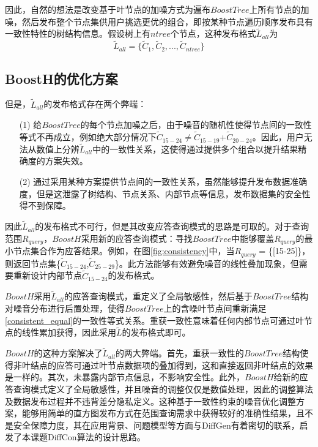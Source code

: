 因此，自然的想法是改变基于叶节点的加噪方式为遍布$BoostTree$上所有节点的加噪，然后发布整个节点集供用户挑选更优的组合，即按某种节点遍历顺序发布具有一致性特性的树结构信息。假设树上有$ntree$个节点，这种发布格式$\tilde{L}_{all}$为
\begin{equation}
\label{L_allnodes}
\tilde{L}_{all} = \{\tilde{C}_{1},\tilde{C}_{2},...,\tilde{C}_{ntree}\}
\end{equation}

\subsection{BoostH的优化方案}
\label{BoostH}

但是，$\tilde{L}_{all}$的发布格式存在两个弊端：
\begin{itemize}
	\item[(1)] 给$BoostTree$的每个节点加噪之后，由于噪音的随机性使得节点间的一致性等式不再成立，例如绝大部分情况下{$\tilde{C}_{15-24}$}$ \neq ${$\tilde{C}_{15-19}$}+{$\tilde{C}_{20-24}$}。因此，用户无法从数值上分辨$\tilde{L}_{all}$中的一致性关系，这使得通过提供多个组合以提升结果精确度的方案失效。
	\item[(2)] 通过采用某种方案提供节点间的一致性关系，虽然能够提升发布数据准确度，但是这泄露了树结构、节点关系、内部节点等信息，发布数据集的安全性得不到保障。
\end{itemize}

因此$\tilde{L}_{all}$的发布格式不可行，但是其改变应答查询模式的思路是可取的。对于查询范围$R_{query}$，$BoostH$采用新的应答查询模式：寻找$BoostTree$中能够覆盖$R_{query}$的最小节点集合作为应答结果。例如，在图\ref{fig:consistency}中，当$R_{query}$ = \{[15-25]\}，则返回节点集\{$\tilde{C}_{15-24}$,$\tilde{C}_{25-29}$\}。此方法能够有效避免噪音的线性叠加现象，但需要重新设计内部节点$\tilde{C}_{15-24}$的发布格式。

$BoostH$采用$\tilde{L}_{all}$的应答查询模式，重定义了全局敏感性，然后基于$BoostTree$结构对噪音分布进行后置处理，使得$BoostTree$上的含噪叶节点间重新满足\ref{consistent_equal}的一致性等式关系。重获一致性意味着任何内部节点可通过叶节点的线性累加获得，因此采用$\tilde{L}$的发布格式即可。

$BoostH$的这种方案解决了$\tilde{L}_{all}$的两大弊端。首先，重获一致性的$BoostTree$结构使得非叶结点的应答可通过叶节点数据项的叠加得到，这和直接返回非叶结点的效果是一样的。其次，未暴露内部节点信息，不影响安全性。此外，$BoostH$给新的应答查询模式定义了全局敏感性，并且噪音的调整仅仅是数值处理，因此的调整算法及数据发布过程并不违背差分隐私定义。这种基于一致性约束的噪音优化调整方案，能够用简单的直方图发布方式在范围查询需求中获得较好的准确性结果，且不是安全保障力度，其在应用背景、问题模型等方面与DiffGen有着密切的联系，启发了本课题DiffCon算法的设计思路。

